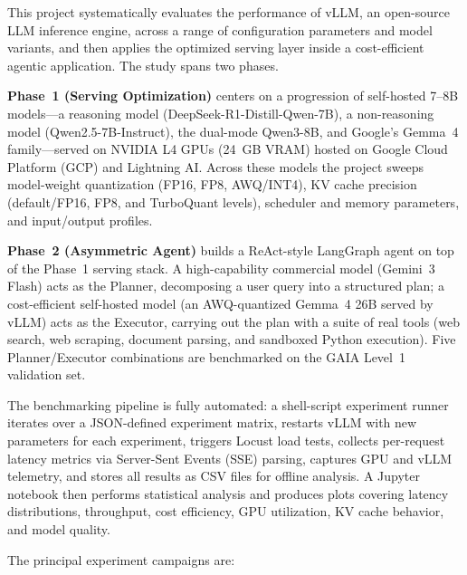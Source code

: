 \documentclass[a4paper,12pt]{report}
\begin{document}
This project systematically evaluates the performance of vLLM, an open-source LLM inference engine, across a range of configuration parameters and model variants, and then applies the optimized serving layer inside a cost-efficient agentic application. The study spans two phases.

\textbf{Phase~1 (Serving Optimization)} centers on a progression of self-hosted 7--8B models---a reasoning model (DeepSeek-R1-Distill-Qwen-7B), a non-reasoning model (Qwen2.5-7B-Instruct), the dual-mode Qwen3-8B, and Google's Gemma~4 family---served on NVIDIA L4 GPUs (24~GB VRAM) hosted on Google Cloud Platform (GCP) and Lightning AI. Across these models the project sweeps model-weight quantization (FP16, FP8, AWQ/INT4), KV cache precision (default/FP16, FP8, and TurboQuant levels), scheduler and memory parameters, and input/output profiles.

\textbf{Phase~2 (Asymmetric Agent)} builds a ReAct-style LangGraph agent on top of the Phase~1 serving stack. A high-capability commercial model (Gemini~3 Flash) acts as the Planner, decomposing a user query into a structured plan; a cost-efficient self-hosted model (an AWQ-quantized Gemma~4 26B served by vLLM) acts as the Executor, carrying out the plan with a suite of real tools (web search, web scraping, document parsing, and sandboxed Python execution). Five Planner/Executor combinations are benchmarked on the GAIA Level~1 validation set.

The benchmarking pipeline is fully automated: a shell-script experiment runner iterates over a JSON-defined experiment matrix, restarts vLLM with new parameters for each experiment, triggers Locust load tests, collects per-request latency metrics via Server-Sent Events (SSE) parsing, captures GPU and vLLM telemetry, and stores all results as CSV files for offline analysis. A Jupyter notebook then performs statistical analysis and produces plots covering latency distributions, throughput, cost efficiency, GPU utilization, KV cache behavior, and model quality.

The principal experiment campaigns are:
\end{document}
